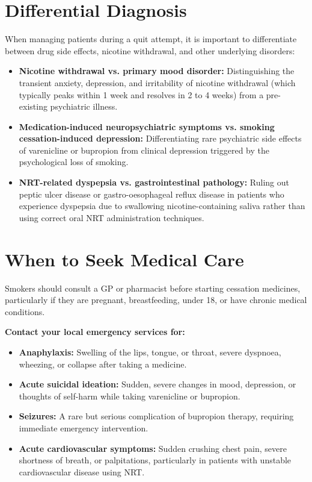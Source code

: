 \section*{Differential Diagnosis}
When managing patients during a quit attempt, it is important to differentiate between drug side effects, nicotine withdrawal, and other underlying disorders:
\begin{itemize}
    \item \textbf{Nicotine withdrawal vs. primary mood disorder:} Distinguishing the transient anxiety, depression, and irritability of nicotine withdrawal (which typically peaks within 1 week and resolves in 2 to 4 weeks) from a pre-existing psychiatric illness.
    \item \textbf{Medication-induced neuropsychiatric symptoms vs. smoking cessation-induced depression:} Differentiating rare psychiatric side effects of varenicline or bupropion from clinical depression triggered by the psychological loss of smoking.
    \item \textbf{NRT-related dyspepsia vs. gastrointestinal pathology:} Ruling out peptic ulcer disease or gastro-oesophageal reflux disease in patients who experience dyspepsia due to swallowing nicotine-containing saliva rather than using correct oral NRT administration techniques.
\end{itemize}

\section*{When to Seek Medical Care}
Smokers should consult a GP or pharmacist before starting cessation medicines, particularly if they are pregnant, breastfeeding, under 18, or have chronic medical conditions.

\textbf{Contact your local emergency services for:}
\begin{itemize}
    \item \textbf{Anaphylaxis:} Swelling of the lips, tongue, or throat, severe dyspnoea, wheezing, or collapse after taking a medicine.
    \item \textbf{Acute suicidal ideation:} Sudden, severe changes in mood, depression, or thoughts of self-harm while taking varenicline or bupropion.
    \item \textbf{Seizures:} A rare but serious complication of bupropion therapy, requiring immediate emergency intervention.
    \item \textbf{Acute cardiovascular symptoms:} Sudden crushing chest pain, severe shortness of breath, or palpitations, particularly in patients with unstable cardiovascular disease using NRT.
\end{itemize}

